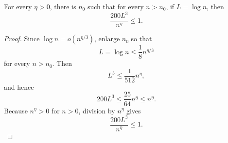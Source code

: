 \begin{helper}
For every \(\eta>0\), there is \(n_0\) such that for every \(n>n_0\), if
\(L=\log n\), then
\[
\frac{200L^3}{n^\eta}\le1.
\]
\end{helper}
\begin{proof}
Since \(\log n=o(n^{\eta/3})\), enlarge \(n_0\) so that
\[
L=\log n\le \frac18 n^{\eta/3}
\]
for every \(n>n_0\).  Then
\[
L^3\le \frac1{512}n^\eta,
\]
and hence
\[
200L^3\le \frac{25}{64}n^\eta\le n^\eta.
\]
Because \(n^\eta>0\) for \(n>0\), division by \(n^\eta\) gives
\[
\frac{200L^3}{n^\eta}\le1.
\]
\end{proof}
